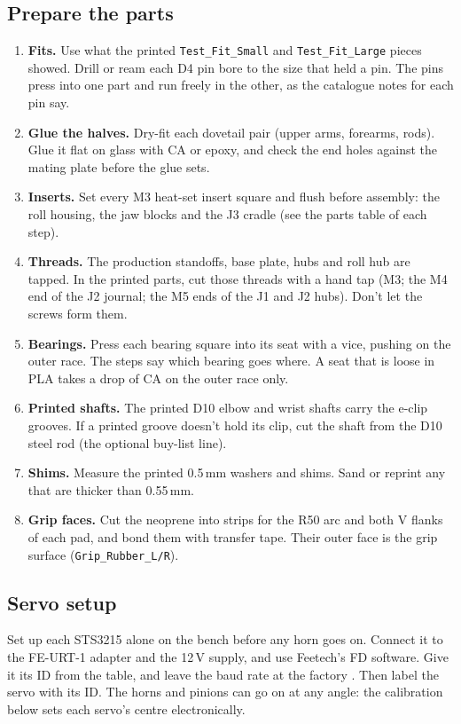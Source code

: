 \documentclass[10pt]{article}
\begin{document}
\subsection{Prepare the parts}
\begin{enumerate}\itemsep0pt
  \item \textbf{Fits.} Use what the printed \texttt{Test\_Fit\_Small} and \texttt{Test\_Fit\_Large} pieces showed. Drill or
  ream each D4 pin bore to the size that held a pin. The pins press into one part and run freely in the other, as the
  catalogue notes for each pin say.
  \item \textbf{Glue the halves.} Dry-fit each dovetail pair (upper arms, forearms, rods). Glue it flat on glass with CA
  or epoxy, and check the end holes against the mating plate before the glue sets.
  \item \textbf{Inserts.} Set every M3 heat-set insert square and flush before assembly: the roll housing, the jaw blocks
  and the J3 cradle (see the parts table of each step).
  \item \textbf{Threads.} The production standoffs, base plate, hubs and roll hub are tapped. In the printed parts, cut
  those threads with a hand tap (M3; the M4 end of the J2 journal; the M5 ends of the J1 and J2 hubs). Don't let the
  screws form them.
  \item \textbf{Bearings.} Press each bearing square into its seat with a vice, pushing on the outer race. The steps say
  which bearing goes where. A seat that is loose in PLA takes a drop of CA on the outer race only.
  \item \textbf{Printed shafts.} The printed D10 elbow and wrist shafts carry the e-clip grooves. If a printed groove
  doesn't hold its clip, cut the shaft from the D10 steel rod (the optional buy-list line).
  \item \textbf{Shims.} Measure the printed 0.5\,mm washers and shims. Sand or reprint any that are thicker than 0.55\,mm.
  \item \textbf{Grip faces.} Cut the neoprene into strips for the R50 arc and both V flanks of each pad, and bond them with
  transfer tape. Their outer face is the grip surface (\texttt{Grip\_Rubber\_L/R}).
\end{enumerate}

\subsection{Servo setup}\label{sec:servo}
Set up each STS3215 alone on the bench before any horn goes on. Connect it to the FE-URT-1 adapter and the 12\,V
supply, and use Feetech's FD software. Give it its ID from the table, and leave the baud rate at the factory
\BusBaud. Then label the servo with its ID.
\BusTable
\noindent The horns and pinions can go on at any angle: the calibration below sets each servo's centre electronically.
\end{document}
